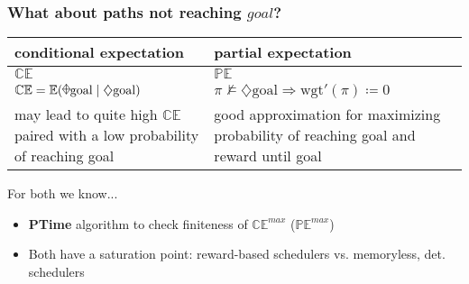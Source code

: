 \documentclass[onlymath]{beamer}
\begin{document}
\begin{frame}
\frametitle{What about paths not reaching $goal$?}
\begin{tabular}{|p{5cm}|p{5cm}|}
\hline
conditional expectation & partial expectation \\ \hline \pause 
$\mathbb{CE}$ & $\mathbb{PE}$ \\ \hline \pause
$\mathbb{CE} = \mathbb{E}(\rawdiaplus \mathrm{goal}\mid \diamondsuit \mathrm{goal})$ & $\pi \nvDash \diamondsuit\mathrm{goal} \Rightarrow \mathrm{wgt}'(\pi)\coloneqq0$ \\ \hline \pause \pause
may lead to quite high $\mathbb{CE}$ paired with a low probability of reaching goal & good approximation for \newline maximizing probability of reaching goal and reward until goal\\ \hline
\end{tabular}
\pause

\vspace{2ex}
For both we know...
\begin{itemize}
	\item \textbf{PTime} algorithm to check finiteness of $\mathbb{CE}^{max}$ ($\mathbb{PE}^{max}$) \pause
	\item Both have a saturation point: reward-based schedulers vs. memoryless, det. schedulers
\end{itemize}
\end{frame}
\end{document}
